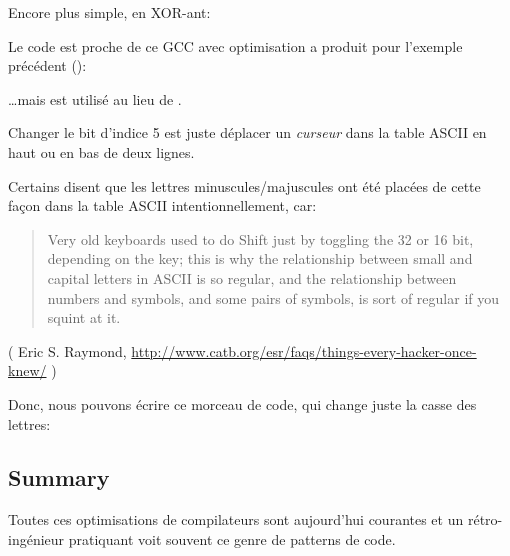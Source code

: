 Encore plus simple, en XOR-ant:



Le code est proche de ce GCC avec optimisation a produit pour l'exemple précédent
():



\dots mais  est utilisé au lieu de  .

Changer le bit d'indice 5 est juste déplacer un \textit{curseur} dans la table \ac{ASCII}
en haut ou en bas de deux lignes.

Certains disent que les lettres minuscules/majuscules ont été placées de cette façon
dans la table \ac{ASCII} intentionnellement, car:

\begin{framed}
\begin{quotation}
Very old keyboards used to do Shift just by toggling the 32 or 16 bit, depending on the key; this is why the relationship between small and capital letters in ASCII is so regular, and the relationship between numbers and symbols, and some pairs of symbols, is sort of regular if you squint at it.
\end{quotation}
\end{framed}

( Eric S. Raymond, \url{http://www.catb.org/esr/faqs/things-every-hacker-once-knew/} )

Donc, nous pouvons écrire ce morceau de code, qui change juste la casse des lettres:



\subsection{Summary}

Toutes ces optimisations de compilateurs sont aujourd'hui courantes et un rétro-ingénieur
pratiquant voit souvent ce genre de patterns de code.
